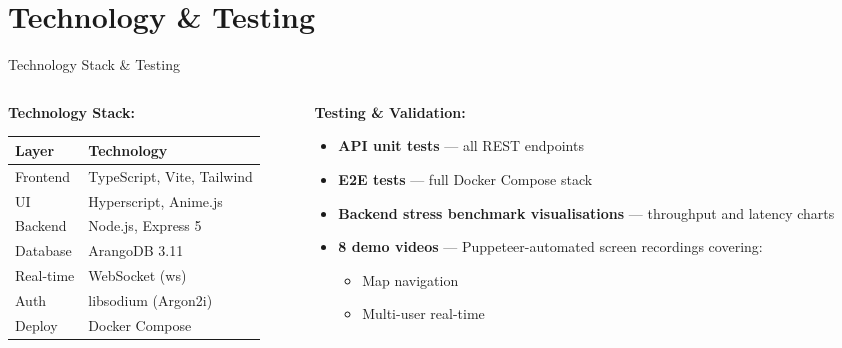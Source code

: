 \documentclass[aspectratio=169,11pt]{beamer}
\begin{document}
\section{Technology \& Testing}

\begin{frame}{Technology Stack \& Testing}
  \begin{columns}[T]
    \begin{column}{0.48\textwidth}
      \textbf{Technology Stack:}
      \begin{center}
      \begin{tabular}{ll}
        \toprule
        \textbf{Layer} & \textbf{Technology} \\
        \midrule
        Frontend  & TypeScript, Vite, Tailwind \\
        UI        & Hyperscript, Anime.js \\
        Backend   & Node.js, Express 5 \\
        Database  & ArangoDB 3.11 \\
        Real-time & WebSocket (ws) \\
        Auth      & libsodium (Argon2i) \\
        Deploy    & Docker Compose \\
        \bottomrule
      \end{tabular}
      \end{center}
    \end{column}
    \begin{column}{0.48\textwidth}
      \textbf{Testing \& Validation:}
      \begin{itemize}
        \item \textbf{API unit tests} --- all REST endpoints
        \item \textbf{E2E tests} --- full Docker Compose stack
        \item \textbf{Backend stress benchmark visualisations} --- throughput and latency charts
        \item \textbf{8 demo videos} --- Puppeteer-automated screen recordings covering:
          \begin{itemize}
            \item Map navigation
            \item Multi-user real-time

\end{itemize}
\end{itemize}
\end{column}
\end{columns}
\end{frame}
\end{document}
